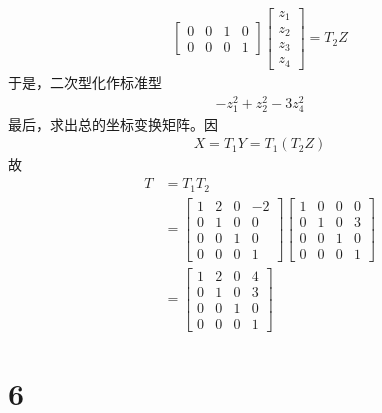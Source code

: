 \documentclass{article}
\begin{document}
\begin{itemize}
\begin{align*}
\begin{bmatrix}
              0 & 0 & 1 & 0 \\
              0 & 0 & 0 & 1
            \end{bmatrix}
          \begin{bmatrix}
            z_1 \\
            z_2 \\
            z_3 \\
            z_4
          \end{bmatrix}
          = T_2 Z
        \end{align*}
        于是，二次型化作标准型
        \begin{align*}
          - z_1^2 + z_2^2 - 3 z_4^2
        \end{align*}
        最后，求出总的坐标变换矩阵。因
        \begin{align*}
          X = T_1 Y = T_1 (T_2 Z)
        \end{align*}
        故
        \begin{align*}
          T & = T_1 T_2         \\
            & =  \begin{bmatrix}
                   1 & 2 & 0 & -2 \\
                   0 & 1 & 0 & 0  \\
                   0 & 0 & 1 & 0  \\
                   0 & 0 & 0 & 1
                 \end{bmatrix}
          \begin{bmatrix}
            1 & 0 & 0 & 0 \\
            0 & 1 & 0 & 3 \\
            0 & 0 & 1 & 0 \\
            0 & 0 & 0 & 1
          \end{bmatrix}        \\
            & = \begin{bmatrix}
                  1 & 2 & 0 & 4 \\
                  0 & 1 & 0 & 3 \\
                  0 & 0 & 1 & 0 \\
                  0 & 0 & 0 & 1
                \end{bmatrix}
        \end{align*}
\end{itemize}

\section*{6}
\end{document}
